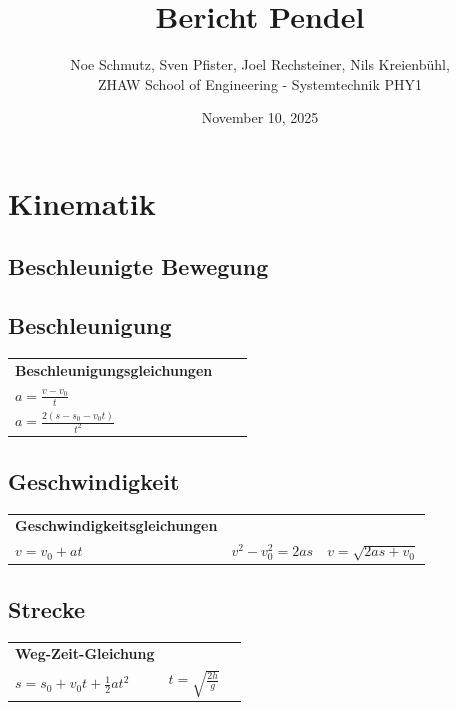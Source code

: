\documentclass[10pt,a4paper]{article}
\title{Bericht Pendel}
\date{November 10, 2025}
\author{Noe Schmutz, Sven Pfister, Joel Rechsteiner, Nils Kreienbühl, \\ ZHAW School of Engineering - Systemtechnik PHY1}
\begin{document}
		\tableofcontents
		\section {Kinematik}
		\subsection{Beschleunigte Bewegung}
		\subsection{Beschleunigung}
		
		\begin{tabular}{p{} p{} p{}}
			
			\textbf{Beschleunigungs­gleichungen} & & \\[4pt]
			
			$a = \frac{v - v_0}{t}$ \\
			$a = \frac{2(s - s_0 - v_0 t)}{t^2}$ & & \\
			
		\end{tabular}
		
		\subsection{Geschwindigkeit}
		
		\begin{tabular}{p{} p{} p{}}
			
			\textbf{Geschwindigkeitsgleichungen} & & \\[4pt]
			
			$v = v_0 + a t$&
			$v^2 - v_0^2 = 2 a s$& 
            $v=\sqrt{2as+v_0}$\\
			
		\end{tabular}
		
		\subsection{Strecke}
		
		\begin{tabular}{p{} p{} p{}}
			
			\textbf{Weg-Zeit-Gleichung} & & \\[4pt]
			
			$s = s_0 + v_0 t + \tfrac12 a t^2$ & 
            $t = \sqrt{\frac{2h}{g}}$\\
			
		\end{tabular}
		
\end{document}
